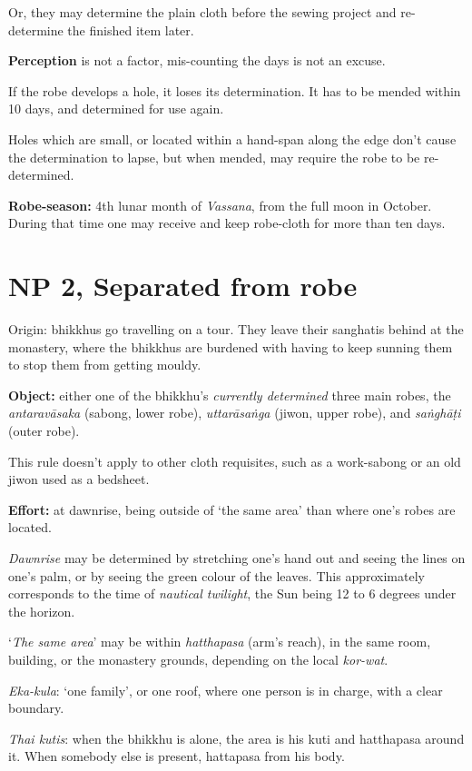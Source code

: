 Or, they may determine the plain cloth before the sewing project and
re-determine the finished item later.

\textbf{Perception} is not a factor, mis-counting the days is not an
excuse.

If the robe develops a hole, it loses its determination. It has to be
mended within 10 days, and determined for use again.

Holes which are small, or located within a hand-span along the edge
don't cause the determination to lapse, but when mended, may require the
robe to be re-determined.

\textbf{Robe-season:} 4th lunar month of \emph{Vassana}, from the full
moon in October. During that time one may receive and keep robe-cloth
for more than ten days.

\section{NP 2, Separated from robe}

Origin: bhikkhus go travelling on a tour. They leave their sanghatis
behind at the monastery, where the bhikkhus are burdened with having to
keep sunning them to stop them from getting mouldy.

\textbf{Object:} either one of the bhikkhu's \emph{currently determined}
three main robes, the \emph{antaravāsaka} (sabong, lower robe),
\emph{uttarāsaṅga} (jiwon, upper robe), and \emph{saṅghāṭi} (outer
robe).

This rule doesn't apply to other cloth requisites, such as a work-sabong
or an old jiwon used as a bedsheet.

\textbf{Effort:} at dawnrise, being outside of `the same area' than
where one's robes are located.

\emph{Dawnrise} may be determined by stretching one's hand out and
seeing the lines on one's palm, or by seeing the green colour of the
leaves. This approximately corresponds to the time of \emph{nautical
twilight}, the Sun being 12 to 6 degrees under the horizon.

`\emph{The same area}' may be within \emph{hatthapasa} (arm's reach), in
the same room, building, or the monastery grounds, depending on the
local \emph{kor-wat}.

\emph{Eka-kula}: `one family', or one roof, where one person is in
charge, with a clear boundary.

\emph{Thai kutis}: when the bhikkhu is alone, the area is his kuti and
hatthapasa around it. When somebody else is present, hattapasa from his
body.

